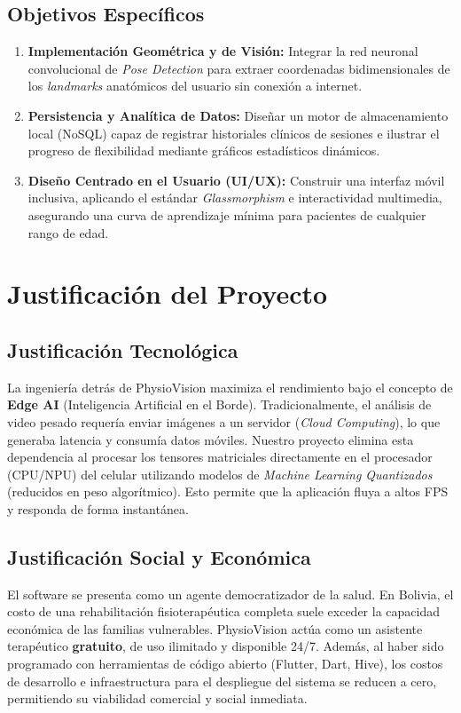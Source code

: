 \documentclass[12pt, a4paper]{article}
\begin{document}
\subsection{Objetivos Específicos}
\begin{enumerate}
    \item \textbf{Implementación Geométrica y de Visión:} Integrar la red neuronal convolucional de \textit{Pose Detection} para extraer coordenadas bidimensionales de los \textit{landmarks} anatómicos del usuario sin conexión a internet.
    \item \textbf{Persistencia y Analítica de Datos:} Diseñar un motor de almacenamiento local (NoSQL) capaz de registrar historiales clínicos de sesiones e ilustrar el progreso de flexibilidad mediante gráficos estadísticos dinámicos.
    \item \textbf{Diseño Centrado en el Usuario (UI/UX):} Construir una interfaz móvil inclusiva, aplicando el estándar \textit{Glassmorphism} e interactividad multimedia, asegurando una curva de aprendizaje mínima para pacientes de cualquier rango de edad.
\end{enumerate}

\section{Justificación del Proyecto}

\subsection{Justificación Tecnológica}
La ingeniería detrás de PhysioVision maximiza el rendimiento bajo el concepto de \textbf{Edge AI} (Inteligencia Artificial en el Borde). Tradicionalmente, el análisis de video pesado requería enviar imágenes a un servidor (\textit{Cloud Computing}), lo que generaba latencia y consumía datos móviles. Nuestro proyecto elimina esta dependencia al procesar los tensores matriciales directamente en el procesador (CPU/NPU) del celular utilizando modelos de \textit{Machine Learning Quantizados} (reducidos en peso algorítmico). Esto permite que la aplicación fluya a altos FPS y responda de forma instantánea.

\subsection{Justificación Social y Económica}
El software se presenta como un agente democratizador de la salud. En Bolivia, el costo de una rehabilitación fisioterapéutica completa suele exceder la capacidad económica de las familias vulnerables. PhysioVision actúa como un asistente terapéutico \textbf{gratuito}, de uso ilimitado y disponible 24/7. Además, al haber sido programado con herramientas de código abierto (Flutter, Dart, Hive), los costos de desarrollo e infraestructura para el despliegue del sistema se reducen a cero, permitiendo su viabilidad comercial y social inmediata.
\end{document}

